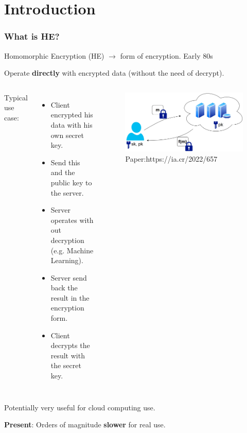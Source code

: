 \documentclass[10pt,handout]{beamer}
\begin{document}

\section{Introduction}
\begin{frame}
\frametitle{What is HE?}


    Homomorphic Encryption (HE) $\rightarrow$ form of encryption. Early 80s
\vspace{-0.3cm}

    Operate \textbf{directly} with encrypted data (without the need of decrypt).
\vspace{0.3cm}
  \begin{columns}
Typical use case:
\begin{itemize}
    \item Client encrypted his data with his own secret key.
    \item Send this and the public key to the server.
    \item Server operates with out decryption (e.g. Machine Learning).
    \item Server send back the result in the encryption form.
    \item Client decrypts the result with the secret key.
\end{itemize}



\begin{figure}[h!]
    \centering
    \includegraphics[scale=0.1]{fhe.jpg}
    \caption{Paper:https://ia.cr/2022/657}
\end{figure}
\end{columns}
 \vspace{-0.3cm}


Potentially very useful for cloud computing use.
 \vspace{-0.3cm}

 \pause
    \textbf{Present}: Orders of magnitude \textbf{slower} for real use.


\end{frame}
\end{document}
